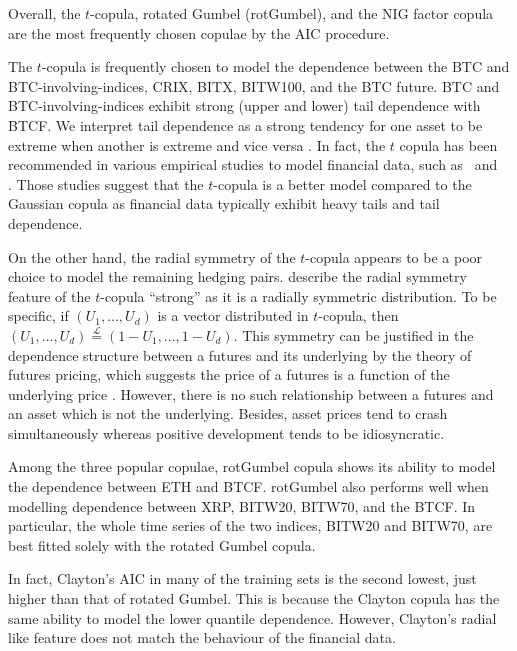 Overall, the $t$-copula, rotated Gumbel (rotGumbel), and the NIG
factor copula are the most frequently chosen copulae by the AIC
procedure. \medskip

The $t$-copula is frequently chosen to model the dependence between
the BTC and BTC-involving-indices, CRIX, BITX, BITW100, and the BTC
future.
BTC and BTC-involving-indices exhibit strong (upper and lower) tail
dependence with BTCF.  We interpret tail dependence as a strong
tendency for one asset to be extreme when another is extreme and
vice versa \citep{McNeil2015}.
In fact, the $t$ copula has been recommended in various empirical
studies to model financial data, such as~\cite{zeevi2002beyond} and~
\cite{breymann2003dependence}.
Those studies suggest that the $t$-copula is a better model compared
to the Gaussian copula as financial data typically exhibit heavy tails
and tail dependence. \medskip

On the other hand, the radial symmetry of the $t$-copula appears to be
a poor choice to model the remaining hedging pairs.
\cite{demarta2005t} describe the radial symmetry feature of the $t$-copula ``strong'' as it is a radially symmetric distribution.
To be specific, if $(U_1, ..., U_d)$ is a vector distributed in $t$-copula,
then $(U_1, ..., U_d) \overset{\mathcal{L}}= (1-U_1, ...,
1-U_d)$.
This symmetry can be justified in the dependence structure between a
futures and its underlying by the theory of futures pricing,
which suggests the price of a futures is a function of the underlying
price \citep{hull2003options}.
However, there is no such relationship between a futures and an asset
which is not the underlying.
Besides, asset prices tend to crash simultaneously whereas positive development tends to be idiosyncratic. \medskip

Among the three popular copulae, rotGumbel copula shows its ability to model the dependence between ETH and BTCF.
rotGumbel also performs well when modelling dependence between XRP, BITW20, BITW70, and the BTCF.
In particular, the whole time series of the two indices, BITW20 and BITW70, are best fitted solely with the rotated Gumbel copula. \medskip

In fact, Clayton's AIC in many of the training sets is the second lowest, just higher than that of rotated Gumbel.
This is because the Clayton copula has the same ability to model the lower quantile dependence.
However, Clayton's radial like feature does not match the behaviour of
the financial data. \medskip

